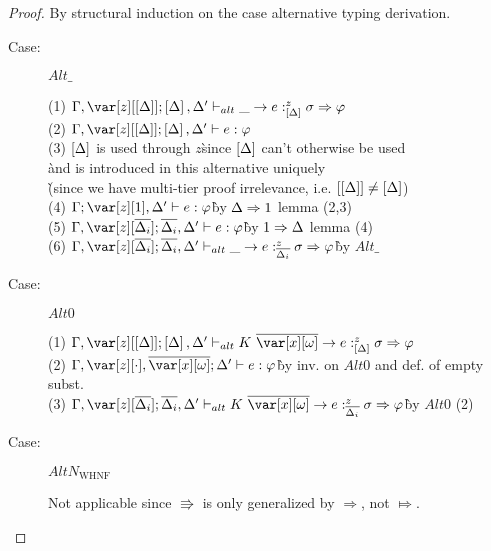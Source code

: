 
\WHNFConvSoundness

\begin{proof}
By structural induction on the case alternative typing derivation.

\begin{description}

\item[Case:] $Alt\_$
\begin{tabbing}
    (1) $\G,\z[\irr{\D}];\irr{\D}, \D' \vdash_{alt} \_ \to e :^z_{\irr{\D}} \s \Rightarrow \vp$\\
    (2) $\G, \z[\irr{\D}];\irr{\D},\D' \vdash e : \vp$\\
    (3) $\left[\Delta\right]$ is used through $z$\`since $\left[\Delta\right]$ can't otherwise be used\\\`and is introduced in this alternative uniquely \\\`(since we have multi-tier proof irrelevance, i.e. $\left[\left[\Delta\right]\right]\neq\left[\Delta\right]$)\\
    (4) $\G; \z[1], \D' \vdash e : \vp$\` by $\Delta \Rightarrow 1$ lemma (2,3)\\
    (5) $\G, \z[\ov{\D_i}]; \ov{\D_i}, \D' \vdash e : \vp$\` by $1 \Rightarrow \Delta$ lemma (4)\\
    (6) $\G, \z[\ov{\D_i}]; \ov{\D_i}, \D' \vdash_{alt} \_ \to e :^z_{\ov{\D_i}} \s \Rightarrow \vp$\` by $Alt\_$\\
\end{tabbing}

\item[Case:] $Alt0$
\begin{tabbing}
    (1) $\G, \z[\irr{\D}]; \irr{\D}, \D' \vdash_{alt} K~\ov{\xo}\to e :^z_{\irr{\D}} \s \Rightarrow \vp$\\
    (2) $\G, \z[\cdot], \ov{\xo}; \D' \vdash e : \vp$\` by inv. on $Alt0$ and def. of empty subst.\\
    (3) $\G, \z[\ov{\D_i}]; \ov{\D_i}, \D' \vdash_{alt} K~\ov{\xo}\to e :^z_{\ov{\D_i}} \s \Rightarrow \vp$\` by $Alt0$ (2)\\
\end{tabbing}

\item[Case:] $AltN_{\textrm{WHNF}}$
\begin{tabbing}
    Not applicable since $\Rrightarrow$ is only generalized by $\Rightarrow$, not $\Mapsto$.
\end{tabbing}


\end{description}
\end{proof}
